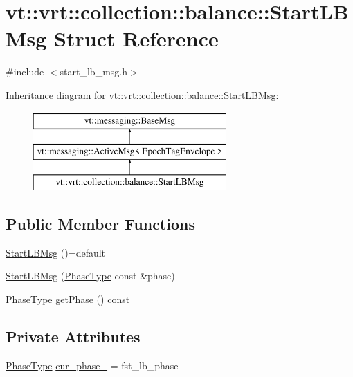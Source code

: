 \hypertarget{structvt_1_1vrt_1_1collection_1_1balance_1_1_start_l_b_msg}{}\section{vt\+:\+:vrt\+:\+:collection\+:\+:balance\+:\+:Start\+L\+B\+Msg Struct Reference}
\label{structvt_1_1vrt_1_1collection_1_1balance_1_1_start_l_b_msg}


{\ttfamily \#include $<$start\+\_\+lb\+\_\+msg.\+h$>$}

Inheritance diagram for vt\+:\+:vrt\+:\+:collection\+:\+:balance\+:\+:Start\+L\+B\+Msg\+:\begin{figure}[H]
\begin{center}
\leavevmode
\includegraphics[height=3.000000cm]{structvt_1_1vrt_1_1collection_1_1balance_1_1_start_l_b_msg}
\end{center}
\end{figure}
\subsection*{Public Member Functions}
\begin{DoxyCompactItemize}
\item 
\hyperlink{structvt_1_1vrt_1_1collection_1_1balance_1_1_start_l_b_msg_af719b75f9ab5ffa464973a030781fb5e}{Start\+L\+B\+Msg} ()=default
\item 
\hyperlink{structvt_1_1vrt_1_1collection_1_1balance_1_1_start_l_b_msg_a0fe9606ee21d5f26bdbebb0510a29dd5}{Start\+L\+B\+Msg} (\hyperlink{namespacevt_a46ce6733d5cdbd735d561b7b4029f6d7}{Phase\+Type} const \&phase)
\item 
\hyperlink{namespacevt_a46ce6733d5cdbd735d561b7b4029f6d7}{Phase\+Type} \hyperlink{structvt_1_1vrt_1_1collection_1_1balance_1_1_start_l_b_msg_ac932d065333978204f0afbc441a23b87}{get\+Phase} () const
\end{DoxyCompactItemize}
\subsection*{Private Attributes}
\begin{DoxyCompactItemize}
\item 
\hyperlink{namespacevt_a46ce6733d5cdbd735d561b7b4029f6d7}{Phase\+Type} \hyperlink{structvt_1_1vrt_1_1collection_1_1balance_1_1_start_l_b_msg_ac209edf0636c6d49cd5a7361d9a03c02}{cur\+\_\+phase\+\_\+} = fst\+\_\+lb\+\_\+phase
\end{DoxyCompactItemize}
